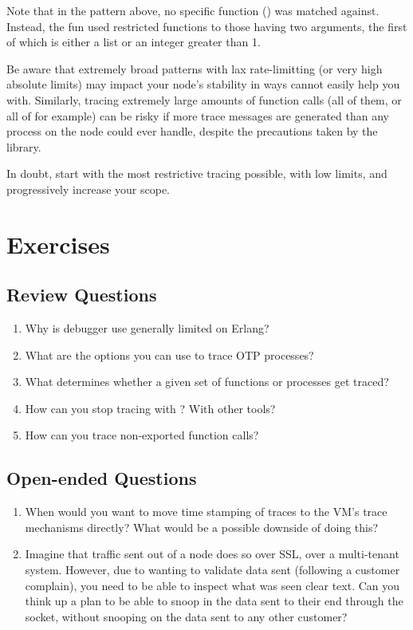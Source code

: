 Note that in the pattern above, no specific function () was matched against. Instead, the fun used restricted functions to those having two arguments, the first of which is either a list or an integer greater than 1.

Be aware that extremely broad patterns with lax rate-limitting (or very high absolute limits) may impact your node's stability in ways  cannot easily help you with. Similarly, tracing extremely large amounts of function calls (all of them, or all of  for example) can be risky if more trace messages are generated than any process on the node could ever handle, despite the precautions taken by the library.

In doubt, start with the most restrictive tracing possible, with low limits, and progressively increase your scope.


\section{Exercises}

\subsection*{Review Questions}

\begin{enumerate}
	\item Why is debugger use generally limited on Erlang?
	\item What are the options you can use to trace OTP processes?
	\item What determines whether a given set of functions or processes get traced?
	\item How can you stop tracing with ? With other tools?
	\item How can you trace non-exported function calls?
\end{enumerate}

\subsection*{Open-ended Questions}

\begin{enumerate}
	\item When would you want to move time stamping of traces to the VM's trace mechanisms directly? What would be a possible downside of doing this?	
	\item Imagine that traffic sent out of a node does so over SSL, over a multi-tenant system. However, due to wanting to validate data sent (following a customer complain), you need to be able to inspect what was seen clear text. Can you think up a plan to be able to snoop in the data sent to their end through the  socket, without snooping on the data sent to any other customer?
\end{enumerate}

